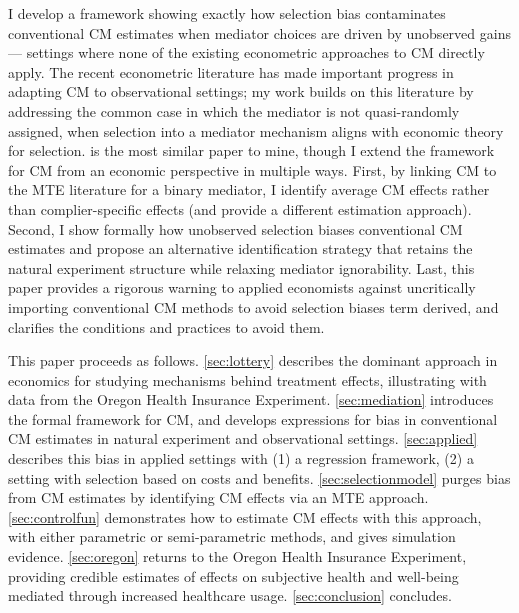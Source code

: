 I develop a framework showing exactly how selection bias contaminates conventional CM estimates when mediator choices are driven by unobserved gains --- settings where none of the existing econometric approaches to CM directly apply.
The recent econometric literature has made important progress in adapting CM to observational settings;
my work builds on this literature by addressing the common case in which the mediator is not quasi-randomly assigned, when selection into a mediator mechanism aligns with economic theory for selection.
\cite{frolich2017direct} is the most similar paper to mine, though I extend the framework for CM from an economic perspective in multiple ways.
First, by linking CM to the MTE literature for a binary mediator, I identify average CM effects rather than complier-specific effects (and provide a different estimation approach).
Second, I show formally how unobserved selection biases conventional CM estimates and propose an alternative identification strategy that retains the natural experiment structure while relaxing mediator ignorability.
Last, this paper provides a rigorous warning to applied economists against uncritically importing conventional CM methods to avoid selection biases term derived, and clarifies the conditions and practices to avoid them.

This paper proceeds as follows.
\autoref{sec:lottery} describes the dominant approach in economics for studying mechanisms behind treatment effects, illustrating with data from the Oregon Health Insurance Experiment.
\autoref{sec:mediation} introduces the formal framework for CM, and develops expressions for bias in conventional CM estimates in natural experiment and observational settings.
\autoref{sec:applied} describes this bias in applied settings with (1) a regression framework, (2) a setting with selection based on costs and benefits.
\autoref{sec:selectionmodel} purges bias from CM estimates by identifying CM effects via an MTE approach.
\autoref{sec:controlfun} demonstrates how to estimate CM effects with this approach, with either parametric or semi-parametric methods, and gives simulation evidence.
\autoref{sec:oregon} returns to the Oregon Health Insurance Experiment, providing credible estimates of effects on subjective health and well-being mediated through increased healthcare usage.
\autoref{sec:conclusion} concludes.
